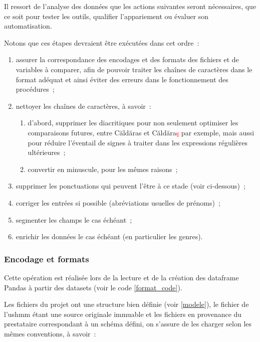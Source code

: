 \documentclass[a4paper,12pt,twoside]{book}
\begin{document}
	            Il ressort de l'analyse des données que les actions suivantes seront nécessaires, que ce soit pour tester les outils, qualifier l'appariement ou évaluer son automatisation.
	            
	            Notons que ces étapes devraient être exécutées dans cet ordre~:
	                
	            \begin{enumerate}
	                \item assurer la correspondance des encodages et des formats des fichiers et de variables à comparer, afin de pouvoir traiter les chaînes de caractères dans le format adéquat et ainsi éviter des erreurs dans le fonctionnement des procédures~;
	                \item nettoyer les chaînes de caractères, à savoir~:
	                    \begin{enumerate}
	                        \item d'abord, supprimer les diacritiques pour non seulement optimiser les comparaisons futures, entre \og{}Căldăras\fg{} et \og{}Căldăra\textcolor{red}{ş}\fg{} par exemple, mais aussi pour réduire l'éventail de signes à traiter dans les expressions régulières ultérieures~;
	                        \item convertir en minuscule, pour les mêmes raisons~;
	                    \end{enumerate}
	                \item supprimer les ponctuations qui peuvent l'être à ce stade (voir ci-dessous)~;
	                \item corriger les entrées si possible (abréviations usuelles de prénoms)~;
	                \item segmenter les champs le cas échéant~;
	                \item enrichir les données le cas échéant (en particulier les genres).
	            \end{enumerate}
	        
	            \subsubsection{Encodage et formats}
	            \label{encod}
	                Cette opération est réalisée lors de la lecture et de la création des dataframe Pandas à partir des datasets (voir le code \ref{format_code}).
	                
	                Les fichiers du projet ont une structure bien définie (voir \ref{modele}), le fichier de l'\gls{ushmm} étant une source originale immuable et les fichiers en provenance du prestataire correspondant à un schéma défini, on s'assure de les charger selon les mêmes conventions, à savoir~:
	                
\end{document}
